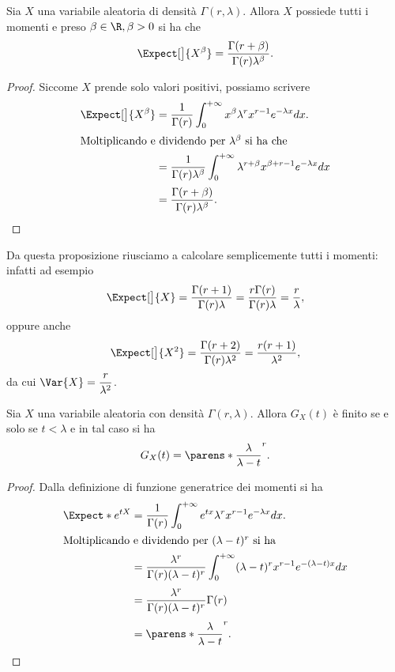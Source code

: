 \begin{proposition}
    Sia $X$ una variabile aleatoria di densità $\Gamma(r, \lambda)$. Allora $X$ possiede tutti i momenti e preso $\beta \in \R, \beta > 0$ si ha che \[
        \Expect[\big]{X^\beta} = \frac{\Gamma(r+\beta)}{\Gamma(r)\lambda^\beta}.    
    \] 
\end{proposition}
\begin{proof}
    Siccome $X$ prende solo valori positivi, possiamo scrivere \begin{align*}
        \Expect[\big]{X^\beta} &=  \frac{1}{\Gamma(r)} \int_0^{+\infty} x^\beta \lambda^r x^{r-1} e^{-\lambda x} dx.\\
        \intertext{Moltiplicando e dividendo per $\lambda^\beta$ si ha che}
        &= \frac{1}{\Gamma(r)\lambda^\beta} \int_0^{+\infty} \lambda^{r+\beta} x^{\beta+r-1} e^{-\lambda x} dx\\[2pt]
        &= \frac{\Gamma(r+\beta)}{\Gamma(r)\lambda^\beta}. \qedhere
    \end{align*}
\end{proof}

Da questa proposizione riusciamo a calcolare semplicemente tutti i momenti: infatti ad esempio \[
    \Expect[\big]{X} = \frac{\Gamma(r+1)}{\Gamma(r)\lambda} = \frac{r\Gamma(r)}{\Gamma(r)\lambda} = \frac{r}{\lambda},    
\] oppure anche \[
    \Expect[\big]{X^2} = \frac{\Gamma(r+2)}{\Gamma(r)\lambda^2} = \frac{r(r+1)}{\lambda^2},    
\] da cui $\Var{X} = \dfrac{r}{\lambda^2}$.

\begin{proposition}
    Sia $X$ una variabile aleatoria con densità $\Gamma(r, \lambda)$. Allora $G_X(t)$ è finito se e solo se $t < \lambda$ e in tal caso si ha \[
        G_X(t) = \parens*{\frac{\lambda}{\lambda - t}}^r.    
    \]
\end{proposition}
\begin{proof}
    Dalla definizione di funzione generatrice dei momenti si ha \begin{align*}
        \Expect*{e^{tX}} 
        &= \frac{1}{\Gamma(r)}\int_0^{+\infty} e^{tx} \lambda^r x^{r-1} e^{-\lambda x} dx.\\
        \intertext{Moltiplicando e dividendo per $(\lambda - t)^r$ si ha}
        &= \frac{\lambda^r}{\Gamma(r)(\lambda - t)^r} \int_0^{+\infty}  (\lambda - t)^r x^{r-1} e^{-(\lambda - t)x} dx\\[3pt]
        &= \frac{\lambda^r}{\Gamma(r)(\lambda - t)^r} \Gamma(r)\\[3pt]
        &= \parens*{\frac{\lambda}{\lambda - t}}^r. \qedhere
    \end{align*}
\end{proof}

